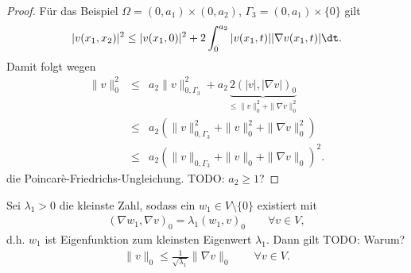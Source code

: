 \begin{proof}
    Für das Beispiel $\Omega = (0,a_1)\times (0,a_2)$, $\Gamma_3 = (0,a_1)\times\{0\}$ gilt
    \begin{eqnarray*}
            |v(x_1, x_2)|^2
        \le |v(x_1, 0)|^2 + 2 \int_0^{a_2} |v(x_1, t)| |\nabla v(x_1, t)| \dt.
    \end{eqnarray*}
    Damit folgt wegen
    \begin{eqnarray*}
              \|v\|_0^2
        &\le& a_2 \|v\|_{0,\Gamma_3}^2 + a_2 \underbrace{2 (|v|, |\nabla v|)_0}
              _{\le \|v\|_0^2 + \|\nabla v\|_0^2} \\
        &\le& a_2 \left(\|v\|_{0,\Gamma_3}^2 + \|v\|_0^2 + \|\nabla v\|_0^2 \right) \\
        &\le& a_2 \left(\|v\|_{0,\Gamma_3} + \|v\|_0 + \|\nabla v\|_0 \right)^2.
    \end{eqnarray*}
    die Poincar\`e-Friedrichs-Ungleichung. TODO: $a_2 \ge 1$?
\end{proof}


\begin{Bemerkung}
    Sei $\lambda_1 > 0 $ die kleinste Zahl, sodass ein $w_1 \in V\setminus \{0\}$ existiert mit
    \begin{eqnarray*}
        (\nabla w_1, \nabla v)_0 = \lambda_1 (w_1, v)_0 \qquad \forall v\in V,
    \end{eqnarray*}
    d.h. $w_1$ ist Eigenfunktion zum kleinsten Eigenwert $\lambda_1$.
    Dann gilt TODO: Warum?
    \begin{eqnarray*}
        \|v\|_0 \le \frac{1}{\sqrt{\lambda_1}} \|\nabla v\|_0
        \qquad \forall v\in V.
    \end{eqnarray*}
\end{Bemerkung}


